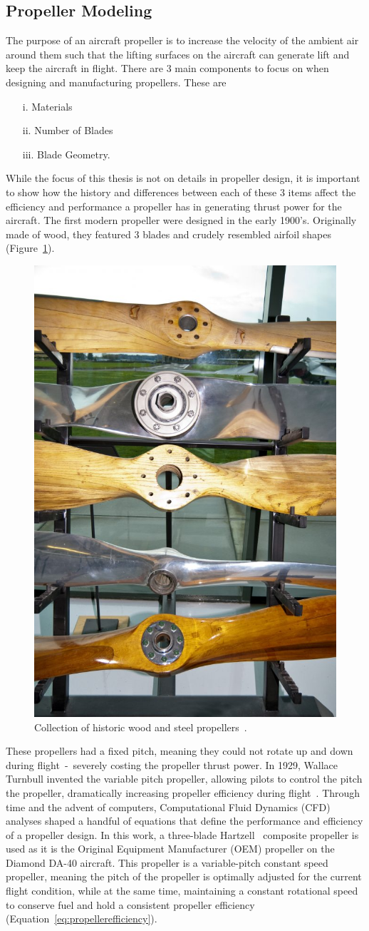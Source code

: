 \subsection{Propeller Modeling}
The purpose of an aircraft propeller is to increase the velocity of the ambient air around them such that the lifting surfaces on the aircraft can generate lift and keep the aircraft in flight. There are 3 main components to focus on when designing and manufacturing propellers. These are
\begin{itemize}
    \item[i.] Materials
    \item[ii.] Number of Blades
    \item[iii.] Blade Geometry.
\end{itemize}
While the focus of this thesis is not on details in propeller design, it is important to show how the history and differences between each of these 3 items affect the efficiency and performance a propeller has in generating thrust power for the aircraft. The first modern propeller were designed in the early 1900's. Originally made of wood, they featured 3 blades and crudely resembled airfoil shapes (Figure~\ref{fig:woodprops}).

\begin{figure}[!ht]\label{fig:woodprops}
    \centering
    \includegraphics[width=0.3\linewidth]{Figures/woodProps.jpg}
    \caption{Collection of historic wood and steel propellers~\cite{ianHowIdentifyHistoric2016}.}
\end{figure}

These propellers had a fixed pitch, meaning they could not rotate up and down during flight~-~severely costing the propeller thrust power. In 1929, Wallace Turnbull invented the variable pitch propeller, allowing pilots to control the pitch the propeller, dramatically increasing propeller efficiency during flight~\cite{ianShortHistoryAircraft2018}. Through time and the advent of computers, Computational Fluid Dynamics (CFD) analyses shaped a handful of equations that define the performance and efficiency of a propeller design. In this work, a three-blade Hartzell~\cite{HartzellPropellerInc} composite propeller is used as it is the Original Equipment Manufacturer (OEM) propeller on the Diamond DA-40 aircraft. This propeller is a variable-pitch constant speed propeller, meaning the pitch of the propeller is optimally adjusted for the current flight condition, while at the same time, maintaining a constant rotational speed to conserve fuel and hold a consistent propeller efficiency (Equation~\ref{eq:propellerefficiency}).

